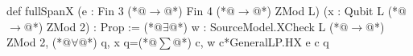def fullSpanX (e : Fin 3 (*@$\to$@*) Fin 4 (*@$\to$@*) ZMod L) (x : Qubit L (*@$\to$@*) ZMod 2) : Prop :=
  (*@$\exists$@*) w : SourceModel.XCheck L (*@$\to$@*) ZMod 2, (*@$\forall$@*) q, x q=(*@$\sum$@*) c, w c*GeneralLP.HX e c q
